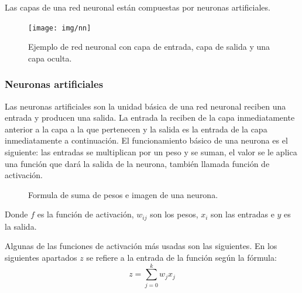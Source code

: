 \documentclass[12pt,a4paper]{article}
\begin{document}
Las capas de una red neuronal están compuestas por neuronas artificiales.

\begin{figure}[H]
\centering
\texttt{[image: img/nn]}
\caption{Ejemplo de red neuronal con capa de entrada, capa de salida y una capa oculta.}
\end{figure}

\subsubsection{Neuronas artificiales}
Las neuronas artificiales son la unidad básica de una red neuronal reciben una entrada y producen una salida. La entrada la reciben de la capa inmediatamente anterior a la capa a la que pertenecen y la salida es la entrada de la capa inmediatamente a continuación. El funcionamiento básico de una neurona es el siguiente: las entradas se multiplican por un peso y se suman, el valor se le aplica una función que dará la salida de la neurona, también llamada función de activación.

\begin{figure}[H]
\centering
{}%
\qquad
{}%
\caption{Formula de suma de pesos e imagen de una neurona.}
\end{figure}

Donde $f$ es la función de activación, $w_{ij}$ son los pesos, $x_{i}$ son las entradas e $y$ es la salida.
\bigskip

Algunas de las funciones de activación más usadas son las siguientes. En los siguientes apartados $z$ se refiere a la entrada de la función según la fórmula:
\begin{equation*}
z = \sum_{j=0}^{k} w_{j} x_{j}
\end{equation*}
\end{document}
